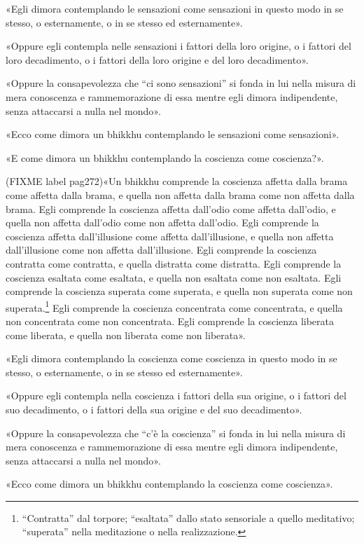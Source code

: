 «Egli dimora contemplando le sensazioni come sensazioni in questo modo
in se stesso, o esternamente, o in se stesso ed esternamente».


«Oppure egli contempla nelle sensazioni i fattori della loro origine, o
i fattori del loro decadimento, o i fattori della loro origine e del
loro decadimento».


«Oppure la consapevolezza che “ci sono sensazioni” si fonda in lui nella
misura di mera conoscenza e rammemorazione di essa mentre egli dimora
indipendente, senza attaccarsi a nulla nel mondo».


«Ecco come dimora un bhikkhu contemplando le sensazioni come
sensazioni».


«E come dimora un bhikkhu contemplando la coscienza come coscienza?».


(FIXME label pag272)«Un bhikkhu comprende la coscienza affetta dalla brama come affetta
dalla brama, e quella non affetta dalla brama come non affetta dalla
brama. Egli comprende la coscienza affetta dall’odio come affetta
dall’odio, e quella non affetta dall’odio come non affetta dall’odio.
Egli comprende la coscienza affetta dall’illusione come affetta
dall’illusione, e quella non affetta dall’illusione come non affetta
dall’illusione. Egli comprende la coscienza contratta come contratta, e
quella distratta come distratta. Egli comprende la coscienza esaltata
come esaltata, e quella non esaltata come non esaltata. Egli comprende
la coscienza superata come superata, e quella non superata come non
superata.\footnote{“Contratta” dal torpore; “esaltata” dallo stato sensoriale a quello meditativo; “superata” nella meditazione o nella realizzazione.}
Egli comprende la coscienza concentrata
come concentrata, e quella non concentrata come non concentrata. Egli
comprende la coscienza liberata come liberata, e quella non liberata
come non liberata».


«Egli dimora contemplando la coscienza come coscienza in questo modo in
se stesso, o esternamente, o in se stesso ed esternamente».


«Oppure egli contempla nella coscienza i fattori della sua origine, o i
fattori del suo decadimento, o i fattori della sua origine e del suo
decadimento».


«Oppure la consapevolezza che “c’è la coscienza” si fonda in lui nella
misura di mera conoscenza e rammemorazione di essa mentre egli dimora
indipendente, senza attaccarsi a nulla nel mondo».


«Ecco come dimora un bhikkhu contemplando la coscienza come coscienza».


